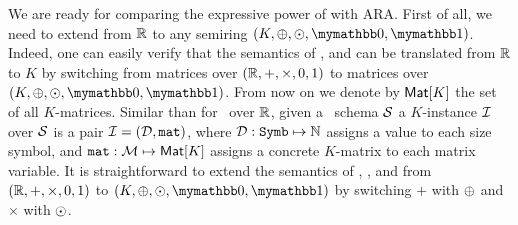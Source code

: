 We are ready for comparing the expressive power of \langsum with ARA. First of all, we need to extend \langsum from $\mathbb{R}$ to any semiring $(K, \ksum, \kprod, \kzero, \kone)$. Indeed, one can easily verify that the semantics of \lang, \langfor and \langsum can be translated from $\mathbb{R}$ to $K$ by switching from matrices over $(\mathbb{R}, +, \times, 0, 1)$ to matrices over $(K, \ksum, \kprod, \kzero, \kone)$.
From now on we denote by  $\textsf{Mat}[K]$ the set of all $K$-matrices. Similar than for \lang\ over $\mathbb{R}$, given a \lang\ schema $\mathcal{S}$ a $K$-instance $\mathcal{I}$ over $\mathcal{S}$ is a pair $\mathcal{I} = (\mathcal{D},\texttt{mat})$, where $\mathcal{D} : \texttt{Symb} \mapsto \mathbb{N}$ assigns a value to each size symbol, and $\texttt{mat} : \mathcal{M} \mapsto \textsf{Mat}[K]$ assigns a concrete $K$-matrix to each matrix variable. It is straightforward to extend the semantics of \lang, \langfor, and \langsum from $(\mathbb{R}, +, \times, 0, 1)$ to $(K, \ksum, \kprod, \kzero, \kone)$ by switching $+$ with $\oplus$ and $\times$ with $\odot$. 


